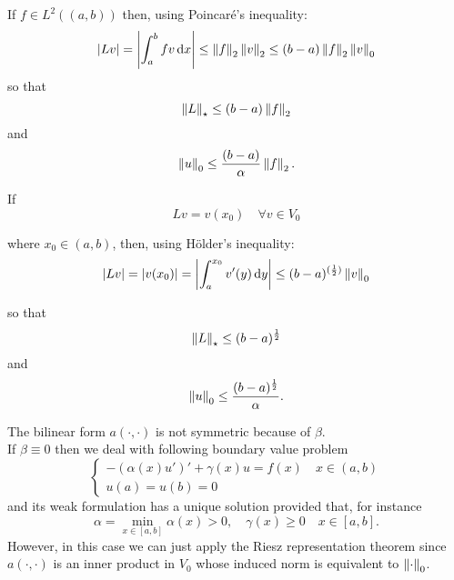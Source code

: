 If $f \in L^2((a,b))$ then, using Poincaré's inequality:
$$
	\left\lvert Lv\right\rvert
	= \left\lvert\int_a^b f v \, \mathrm d x\right\rvert
	\leq \left\lVert f\right\rVert_2\left\lVert v\right\rVert_2
	\leq (b-a)\left\lVert f\right\rVert_2\left\lVert v\right\rVert_0
$$
so that
$$
	\left\lVert L\right\rVert_\star
	\leq (b-a)\left\lVert f\right\rVert_2
$$
and
$$
	\left\lVert u\right\rVert_0
	\leq \frac{(b-a)}{\alpha} \left\lVert f\right\rVert_2
	.
$$

If
$$Lv 
	= v(x_0) 
	\quad \forall v \in V_0
$$

where $x_0 \in (a,b)$, then, using Hölder's inequality:
$$
	\left\lvert Lv\right\rvert
	= \left\lvert v(x_0)\right\rvert
	= \left\lvert\int_a^{x_0} v'(y) \, \mathrm d y\right\rvert
	\leq (b-a)^{(\frac 1 2)} \left\lVert v\right\rVert_0
$$

so that
$$
	\left\lVert L\right\rVert_\star
	\leq (b-a)^{\frac 1 2}
$$
and
$$
	\left\lVert u\right\rVert_0
	\leq
	\frac{(b-a)^{\frac 1 2}}{\alpha}
	.
$$

The bilinear form $a(\cdot, \cdot)$ is not symmetric because of $\beta$.\\
If $\beta \equiv 0$ then we deal with following boundary value problem
$$
	\begin{cases}
	-(\alpha(x)u')' 
	+ \gamma(x)u 
	= f(x) 
	\quad x \in (a,b)\\
	u(a) 
	= u(b) 
	= 0
	\end{cases}
$$
and its weak formulation has a unique solution provided that, for instance
$$
	\alpha = \min_{x\in [a,b]} \alpha (x) > 0
	, 
	\quad \gamma(x)\geq 0 
	\quad x \in [a,b]
	.
$$
However, in this case we can just apply the Riesz representation theorem since $a(\cdot, \cdot)$ is an inner product in $V_0$ whose induced norm is equivalent to $\left\lVert\cdot\right\rVert_0$.
